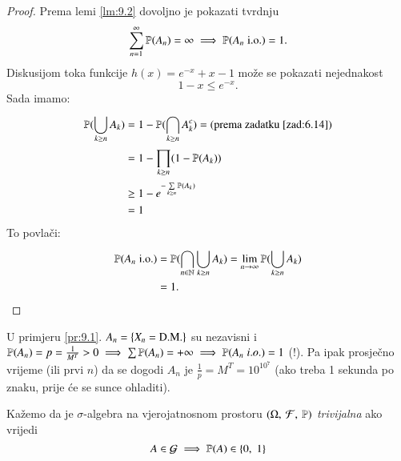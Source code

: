 \begin{proof}
    Prema lemi \ref{lm:9.2} dovoljno je pokazati tvrdnju
    \begin{equation*}
        \sum\limits_{n = 1}^{\infty} \mathbb{P}({A_n}) = \infty \implies \mathbb{P}({A_n \; \mathrm{i.o.}}) = 1.
    \end{equation*}
    Diskusijom toka funkcije $h(x) = e^{-x} + x - 1$ mo\v ze se pokazati nejednakost
    \begin{equation*}
        1 - x \leq e^{-x}.
    \end{equation*}
    Sada imamo:
    \begin{equation*}
        \begin{aligned}
            \mathbb{P}({\bigcup\limits_{k \geq n}^{} A_k}) &= 1 - \mathbb{P}({\bigcap\limits_{k \geq n}^{} A_k^c}) = (\textnormal{prema zadatku \ref{zad:6.14}})\\
            &= 1 - \prod\limits_{k \geq n}^{} (1 - \mathbb{P}({A_k}))\\
            &\geq 1 - e^{- \sum\limits_{k \geq n}^{} \mathbb{P}({A_k})}\\
            &= 1
        \end{aligned}
    \end{equation*}
    To povla\v ci:
    \begin{equation*}
        \begin{aligned}
            \mathbb{P}({A_n \; \mathrm{i.o.}}) &= \mathbb{P}({\bigcap\limits_{n \in \mathbb{N}}^{} \bigcup\limits_{k \geq n}^{} A_k}) = \lim\limits_{n \to \infty} \mathbb{P}({\bigcup\limits_{k \geq n}^{} A_k})\\
            &= 1.
        \end{aligned}
    \end{equation*}
\end{proof}

\begin{nap} \label{nap:9.4}
    U primjeru \ref{pr:9.1}. $A_n = \{ X_n = \textnormal{D.M.} \}$ su nezavisni i $\mathbb{P}({A_n}) = p = \frac{1}{M^T} > 0 \implies \sum \mathbb{P}({A_n}) = +\infty \implies \mathbb{P}({A_n \; i.o.}) = 1$ (!).
    Pa ipak prosje\v cno vrijeme (ili prvi $n$) da se dogodi $A_n$ je $\frac{1}{p} = M^T = 10^{10^7}$ (ako treba 1 sekunda po znaku, prije \' ce se sunce ohladiti).
\end{nap}

\begin{defn}    \label{defn:9.5}
    Ka\v zemo da je $\sigma$-algebra na vjerojatnosnom prostoru $(\Omega, \: \mathcal{F}, \: \mathbb{P})$ \emph{trivijalna} ako vrijedi
    \begin{equation*}
        A \in \mathcal{G} \implies \mathbb{P}({A}) \in \{0, \; 1\}
    \end{equation*}
\end{defn}

